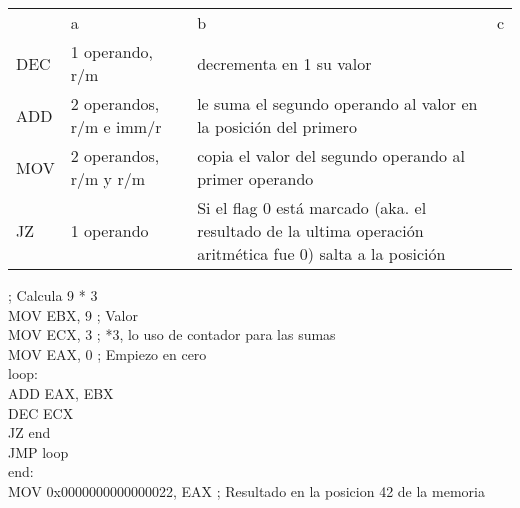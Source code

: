 \documentclass[12pt]{article}
\begin{document}
\begin{enumerate}
\begin{enumerate}
\begin{table}[]
\begin{tabular}{l|lll}
  & a & b & c \\
 DEC & 1 operando, r/m & decrementa en 1 su valor &  \\
 ADD & 2 operandos, r/m e imm/r & le suma el segundo operando al valor en la posición del primero & 		 \\
 MOV & 2 operandos, r/m y r/m & copia el valor del segundo operando al primer operando &  \\
 JZ & 1 operando & Si el flag 0 está marcado (aka. el resultado de la ultima operación aritmética fue 0) salta a la posición & %
\end{tabular}
\end{table}

; Calcula 9 * 3 \\
MOV EBX, 9 ; Valor \\
MOV ECX, 3 ; *3, lo uso de contador para las sumas \\
MOV EAX, 0 ; Empiezo en cero \\
loop: \\
	ADD EAX, EBX \\
	DEC ECX \\
	JZ end \\
	JMP loop \\
end: \\
	MOV 0x0000000000000022, EAX ; Resultado en la posicion 42 de la memoria \\

\end{enumerate}

\end{enumerate}
\end{document}
